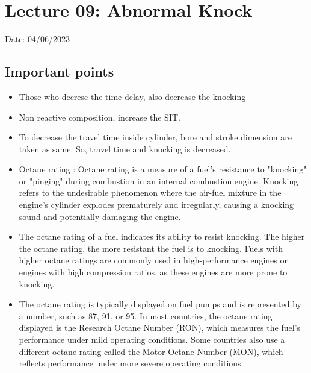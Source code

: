\documentclass{article}
\begin{document}
\section{Lecture 09: Abnormal Knock} 
\hfill Date: 04/06/2023

\subsection*{Important points}
\begin{itemize}
  \item Those who decrese the time delay, also decrease the knocking 
  \item Non reactive composition, increase the SIT. 
  \item To decrease the travel time inside cylinder, bore and stroke dimension are taken as same. So, travel time and knocking is decreased. 
  \item Octane rating : Octane rating is a measure of a fuel's resistance to "knocking" or "pinging" during combustion in an internal combustion engine. Knocking refers to the undesirable phenomenon where the air-fuel mixture in the engine's cylinder explodes prematurely and irregularly, causing a knocking sound and potentially damaging the engine.
  \item The octane rating of a fuel indicates its ability to resist knocking. The higher the octane rating, the more resistant the fuel is to knocking. Fuels with higher octane ratings are commonly used in high-performance engines or engines with high compression ratios, as these engines are more prone to knocking.
  \item The octane rating is typically displayed on fuel pumps and is represented by a number, such as 87, 91, or 95. In most countries, the octane rating displayed is the Research Octane Number (RON), which measures the fuel's performance under mild operating conditions. Some countries also use a different octane rating called the Motor Octane Number (MON), which reflects performance under more severe operating conditions.
\end{itemize}
\end{document}
